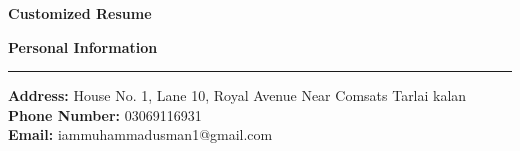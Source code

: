 \documentclass{article}
\newcommand{\personalinfo}[3]{%
    \noindent\textbf{Address:} #1 \\
    \textbf{Phone Number:} #2 \\
    \textbf{Email:} #3 \\
}
\newcommand{\sectionheader}[1]{%
    \noindent\textbf{\Large #1} \\
    \hrule
}
\begin{document}
\begin{center}
    \Huge\textbf{Customized Resume}
\end{center}

\sectionheader{Personal Information}
\personalinfo{House No. 1, Lane 10, Royal Avenue Near Comsats Tarlai kalan}{03069116931}{iammuhammadusman1@gmail.com}
\end{document}
